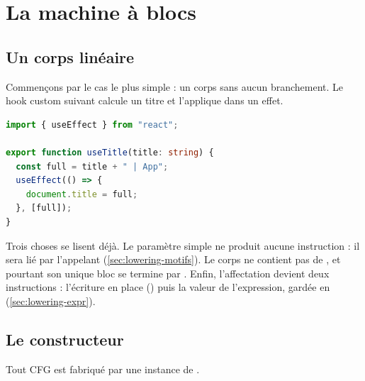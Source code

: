 \section{La machine à blocs}
\label{sec:lowering-machine}

\subsection{Un corps linéaire}

Commençons par le cas le plus simple : un corps sans aucun branchement. Le hook custom suivant calcule un titre et l'applique dans un effet.

\begin{lstlisting}[language=TypeScript,caption={Un corps linéaire, sans \code{return} (\file{/tmp/ch07/c1_linear.tsx})},label={lst:lowering-linear}]
import { useEffect } from "react";

export function useTitle(title: string) {
  const full = title + " | App";
  useEffect(() => {
    document.title = full;
  }, [full]);
}
\end{lstlisting}


Trois choses se lisent déjà. Le paramètre simple  ne produit aucune instruction : il sera lié par l'appelant (\cref{sec:lowering-motifs}). Le corps ne contient pas de , et pourtant son unique bloc se termine par . Enfin, l'affectation  devient deux instructions : l'écriture en place () puis la valeur de l'expression, gardée en  (\cref{sec:lowering-expr}).

\subsection{Le constructeur}

Tout CFG est fabriqué par une instance de .


